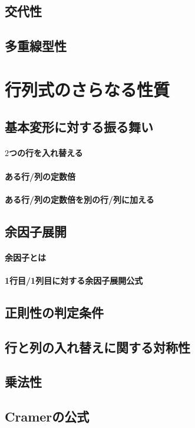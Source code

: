 
\subsection{交代性}

\subsection{多重線型性}

\section{行列式のさらなる性質}

\subsection{基本変形に対する振る舞い}

\paragraph{$2$つの行を入れ替える}

\paragraph{ある行/列の定数倍}

\paragraph{ある行/列の定数倍を別の行/列に加える}

\subsection{余因子展開}

\paragraph{余因子とは}

\paragraph{1行目/1列目に対する余因子展開公式}

\subsection{正則性の判定条件}

\subsection{行と列の入れ替えに関する対称性}

\subsection{乗法性}

\subsection{Cramerの公式}

